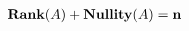 \documentclass[preview]{standalone}
\begin{document}
\begin{align*}
\textbf{\text{Rank}}(A) + \textbf{\text{Nullity}}(A) = \textbf{n}
\end{align*}
\end{document}
